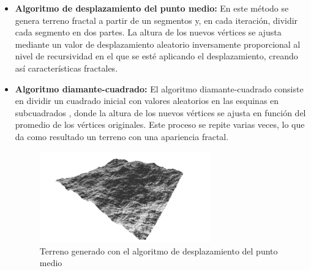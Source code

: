 \begin{itemize}
\begin{itemize}
                    \item \textbf{Algoritmo de desplazamiento del punto medio:} En este método se genera terreno fractal a partir de un segmentos y, en cada iteración, dividir cada segmento en dos partes. La altura de los nuevos vértices se ajusta mediante un valor de desplazamiento aleatorio inversamente proporcional al nivel de recursividad en el que se esté aplicando el desplazamiento, creando así características fractales. \cite{DesplazamientoPuntoMedio}
                    \item \textbf{Algoritmo diamante-cuadrado:} El algoritmo diamante-cuadrado consiste en dividir un cuadrado inicial con valores aleatorios en las esquinas en subcuadrados , donde la altura de los nuevos vértices se ajusta en función del promedio de los vértices originales. Este proceso se repite varias veces, lo que da como resultado un terreno con una apariencia fractal. \cite{DiamanteCuadrado}
                    \begin{figure}[h]
                        \centering
                        \includegraphics[width=0.7\textwidth]{img/terreno fractal.png}
                        \caption{Terreno generado con el algoritmo de desplazamiento del punto medio}
                    \end{figure}
                \end{itemize}


\end{itemize}
